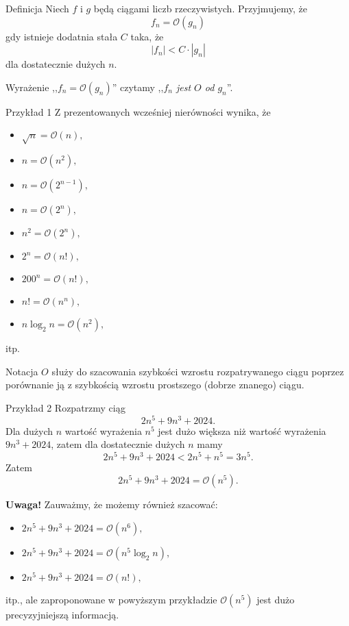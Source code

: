 \documentclass[a4paper,10pt]{beamer}
\begin{document}
\begin{frame}

\begin{block}{Definicja}
Niech $f$ i $g$ będą ciągami liczb rzeczywistych. Przyjmujemy, że $$f_n=\mathcal{O}(g_n)$$ gdy istnieje dodatnia stała $C$ taka, że
$$|f_n|<C\cdot|g_n|$$ dla dostatecznie dużych $n$.
\end{block}

\bigskip

Wyrażenie ,,$f_n=\mathcal{O}(g_n)$'' czytamy ,,{\it $f_n$ jest $O$ od $g_n$}''.

\end{frame}


\begin{frame}
\begin{exampleblock}{Przykład 1}
Z prezentowanych wcześniej nierówności wynika, że
\begin{multicols}{3}
\begin{itemize}
\item $\sqrt{n}=\mathcal{O}(n),$
\item $n=\mathcal{O}(n^2),$
\item $n=\mathcal{O}(2^{n-1}),$
\item $n=\mathcal{O}(2^n),$
\item $n^2=\mathcal{O}(2^n),$
\item $2^n=\mathcal{O}(n!),$
\item $200^n=\mathcal{O}(n!),$
\item $n!=\mathcal{O}(n^n),$
\item $n\log_2{n}=\mathcal{O}(n^2),$
\end{itemize}
\end{multicols}
itp.
\end{exampleblock}

\bigskip

Notacja $O$ służy do szacowania szybkości wzrostu rozpatrywanego ciągu poprzez porównanie ją z szybkością wzrostu prostszego (dobrze znanego) ciągu.
\end{frame}


\begin{frame}
\begin{exampleblock}{Przykład 2}%
Rozpatrzmy ciąg $$2n^5+9n^3+2024.$$ Dla dużych $n$ wartość wyrażenia $n^5$ jest dużo większa niż wartość wyrażenia $9n^3+2024$, zatem dla dostatecznie dużych $n$ mamy
$$2n^5+9n^3+2024<2n^5+n^5=3n^5.$$
Zatem $$2n^5+9n^3+2024=\mathcal{O}(n^5).$$
\end{exampleblock}

{\bf Uwaga!} Zauważmy, że możemy również szacować:
\begin{itemize}
\item $2n^5+9n^3+2024=\mathcal{O}(n^6),$
\item $2n^5+9n^3+2024=\mathcal{O}(n^5\log_2n),$
\item $2n^5+9n^3+2024=\mathcal{O}(n!),$
\end{itemize}
itp., ale zaproponowane w powyższym przykładzie $\mathcal{O}(n^5)$ jest dużo precyzyjniejszą informacją.
\end{frame}
\end{document}

